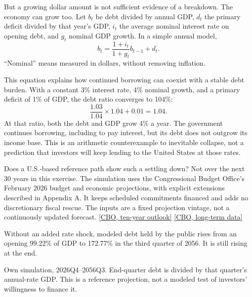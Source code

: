 \documentclass[11pt,letterpaper]{article}
\newcommand{\src}[2]{\href{#1}{#2}}
\begin{document}
But a growing dollar amount is not sufficient evidence of a breakdown. The
economy can grow too. Let \(b_t\) be debt divided by annual GDP, \(d_t\) the
primary deficit divided by that year's GDP, \(i_t\) the average nominal interest
rate on opening debt, and \(g_t\) nominal GDP growth. In a simple annual model,
\begin{equation}
 b_t=\frac{1+i_t}{1+g_t}b_{t-1}+d_t.
 \label{eq:annual}
\end{equation}
\textquotedblleft Nominal\textquotedblright{} means measured in dollars,
without removing inflation.

This equation explains how continued borrowing can coexist with a stable debt
burden. With a constant 3\% interest rate, 4\% nominal growth, and a primary
deficit of 1\% of GDP, the debt ratio converges to 104\%:
\[
 \frac{1.03}{1.04}\times 1.04+0.01=1.04.
\]
At that ratio, both the debt and GDP grow 4\% a year. The government continues
borrowing, including to pay interest, but its debt does not outgrow its income
base. This is an arithmetic counterexample to inevitable collapse, not a
prediction that investors will keep lending to the United States at those rates.

Does a U.S.-based reference path show such a settling down? Not over the next
30 years in this exercise. The simulation uses the Congressional Budget
Office's February 2026 budget and economic projections, with explicit
extensions described in Appendix A. It keeps scheduled commitments financed
and adds no discretionary fiscal rescue.
The inputs are a fixed projection vintage, not a continuously updated forecast.
\src{https://www.cbo.gov/publication/62105}{[CBO, ten-year outlook]}
\src{https://www.cbo.gov/publication/62044}{[CBO, long-term data]}

Without an added rate shock, modeled debt held by the public rises from an
opening 99.22\% of GDP to 172.77\% in the third quarter of 2056.
It is still rising at the end.

\begin{center}
\begin{minipage}{0.94\linewidth}
{\footnotesize Own simulation, 2026Q4--2056Q3. End-quarter debt is divided by
that quarter's annual-rate GDP. This is a reference projection, not a modeled
test of investors' willingness to finance it.}
\end{minipage}
\end{center}
\end{document}
